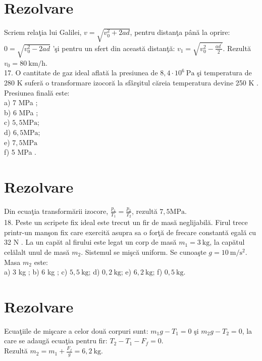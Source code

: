 \section*{Rezolvare}
Scriem relaţia lui Galilei, $v=\sqrt{v_{0}^{2}+2 a d}$, pentru distanţa până la oprire: $0=\sqrt{v_{0}^{2}-2 a d}$ 'şi pentru un sfert din această distanţă: $v_{1}=\sqrt{v_{0}^{2}-\frac{a d^{\prime}}{2}}$. Rezultă $v_{0}=80 \mathrm{~km} / \mathrm{h}$.\\
17. O cantitate de gaz ideal aflată la presiunea de $8,4 \cdot 10^{6} \mathrm{~Pa}$ şi temperatura de 280 K suferă o transformare izocoră la sfârşitul căreia temperatura devine 250 K . Presiunea finală este:\\
a) 7 MPa ;\\
b) 6 MPa ;\\
c) $5,5 \mathrm{MPa}$;\\
d) $6,5 \mathrm{MPa}$;\\
e) $7,5 \mathrm{MPa}$\\
f) 5 MPa .

\section*{Rezolvare}
Din ecuaţia transformării izocore, $\frac{p_{1}}{T_{1}}=\frac{p_{2}}{T_{2}}$, rezultă $7,5 \mathrm{MPa}$.\\
18. Peste un scripete fix ideal este trecut un fir de masă neglijabilă. Firul trece printr-un manşon fix care exercită asupra sa o forţă de frecare constantă egală cu 32 N . La un capăt al firului este legat un corp de masă $m_{1}=3 \mathrm{~kg}$, la capătul celălalt unul de masă $m_{2}$. Sistemul se mişcă uniform. Se cunoaşte $g=10 \mathrm{~m} / \mathrm{s}^{2}$. Masa $m_{2}$ este:\\
a) 3 kg ; b) 6 kg ; c) $5,5 \mathrm{~kg}$; d) $0,2 \mathrm{~kg}$; e) $6,2 \mathrm{~kg}$; f) $0,5 \mathrm{~kg}$.

\section*{Rezolvare}
Ecuaţiile de mişcare a celor două corpuri sunt: $m_{1} g-T_{1}=0$ şi $m_{2} g-T_{2}=0$, la care se adaugă ecuaţia pentru fir: $T_{2}-T_{1}-F_{f}=0$.\\
Rezultă $m_{2}=m_{1}+\frac{F_{f}}{g}=6,2 \mathrm{~kg}$.


